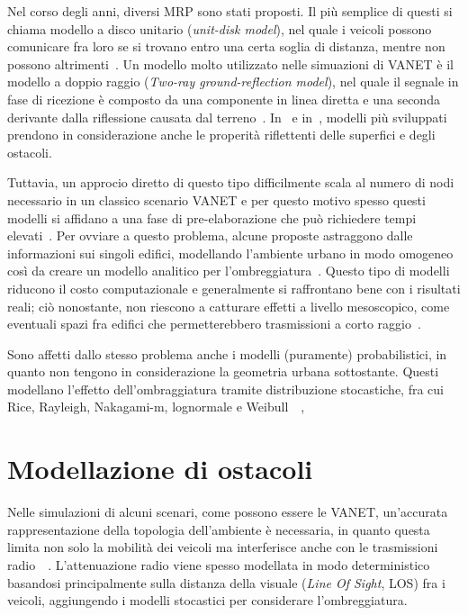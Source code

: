 Nel corso degli anni, diversi MRP sono stati proposti.
Il più semplice di questi si chiama modello a disco unitario (\textit{unit-disk model}), nel quale i veicoli possono comunicare fra loro se si trovano entro una certa soglia
di distanza, mentre non possono altrimenti~\cite{6554832}.
Un modello molto utilizzato nelle simuazioni di VANET è il modello a doppio raggio (\textit{Two-ray ground-reflection model}),
nel quale il segnale in fase di ricezione è composto da una componente in linea diretta e una seconda derivante dalla riflessione causata dal terreno~\cite{DBLP:books/daglib/0091821}.
In~\cite{Schmitz:2006:ERW:1164717.1164730} e in~\cite{Souley2005RealisticUS}, modelli più sviluppati prendono in considerazione anche le properità riflettenti delle superfici e degli ostacoli.

Tuttavia, un approcio diretto di questo tipo difficilmente scala al numero di nodi necessario in un classico scenario VANET e per questo motivo
spesso questi modelli si affidano a una fase di pre-elaborazione che può richiedere tempi elevati~\cite{Stepanov:2008:IMR:1293378.1293656}.
Per ovviare a questo problema, alcune proposte astraggono dalle informazioni sui singoli edifici, modellando l'ambiente urbano in modo omogeneo
così da creare un modello analitico per l'ombreggiatura~\cite{1492678}.
Questo tipo di modelli riducono il costo computazionale e generalmente si raffrontano bene con i risultati reali;
ciò nonostante, non riescono a catturare effetti a livello mesoscopico, come eventuali spazi fra edifici che permetterebbero trasmissioni a corto raggio~\cite{Giordano:2010:CST:1860058.1860065}.

Sono affetti dallo stesso problema anche i modelli (puramente) probabilistici, in quanto non tengono in considerazione la geometria urbana sottostante.
Questi modellano l'effetto dell'ombraggiatura tramite distribuzione stocastiche, fra cui Rice, Rayleigh, Nakagami-m, lognormale e Weibull~\cite{6554832}~\cite{Rappaport:2001:WCP:559977},
%
\section{Modellazione di ostacoli}
Nelle simulazioni di alcuni scenari, come possono essere le VANET, un'accurata rappresentazione della topologia dell'ambiente è necessaria,
in quanto questa limita non solo la mobilità dei veicoli ma interferisce anche con le trasmissioni radio~\cite{7543980}~\cite{amjad2015impact}.
L'attenuazione radio viene spesso modellata in modo deterministico basandosi principalmente sulla distanza della visuale (\textit{Line Of Sight}, LOS)
fra i veicoli, aggiungendo i modelli stocastici per considerare l'ombreggiatura.

